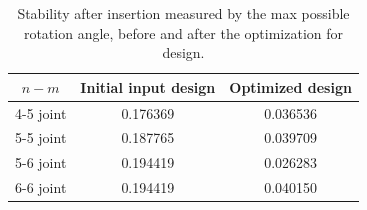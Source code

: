 \documentclass[letterpaper, 10 pt, conference]{ieeeconf}
\begin{document}
\begin{table}[h!]
  \begin{center}
    \caption{Stability after insertion measured by the max possible rotation angle, before and after the optimization for design.}
    \label{tab:table1}
    \begin{tabular}{|c | c | c|}
    \hline
      \textbf{$n-m$ } & \textbf{Initial input design} & \textbf{Optimized design}\\
      \hline
      4-5 joint & 0.176369 & 0.036536\\
      \hline
      5-5 joint & 0.187765 & 0.039709\\
      \hline
      5-6 joint & 0.194419 & 0.026283\\
      \hline
     6-6 joint & 0.194419 & 0.040150\\
      \hline
    \end{tabular}
  \end{center}
\end{table}
\end{document}
